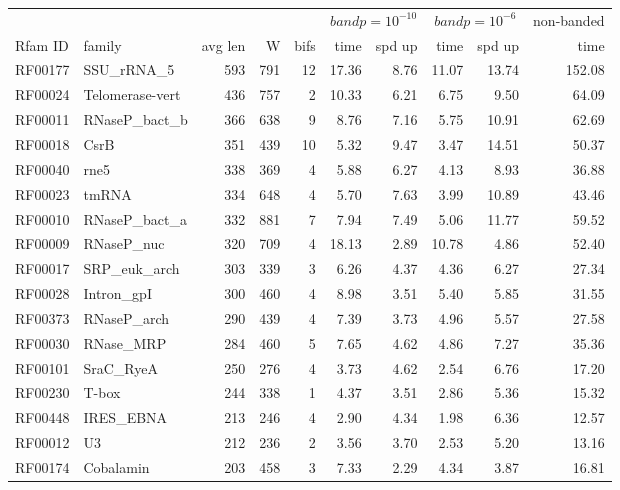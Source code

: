
\begin{table}
\scriptsize
\begin{center}
\begin{tabular}{|ll|rrr|rr|rr|r|} \cline{6-10}
\multicolumn{5}{c}{} & \multicolumn{2}{|c|}{$bandp = 10^{-10}$} &
  \multicolumn{2}{c|}{$bandp = 10^{-6}$} & \multicolumn{1}{c|}{non-banded} \\ \cline{1-5}
Rfam ID & family & avg len & W & bifs & time & spd up & time & spd up & time \\ \hline 
RF00177 & SSU\_rRNA\_5 & 593 & 791 & 12 & 17.36 & 8.76 & 11.07 & 13.74 & 152.08 \\  
RF00024 & Telomerase-vert & 436 & 757 & 2 & 10.33 & 6.21 & 6.75 & 9.50 & 64.09 \\  
RF00011 & RNaseP\_bact\_b & 366 & 638 & 9 & 8.76 & 7.16 & 5.75 & 10.91 & 62.69 \\  
RF00018 & CsrB & 351 & 439 & 10 & 5.32 & 9.47 & 3.47 & 14.51 & 50.37 \\  
RF00040 & rne5 & 338 & 369 & 4 & 5.88 & 6.27 & 4.13 & 8.93 & 36.88 \\  
RF00023 & tmRNA & 334 & 648 & 4 & 5.70 & 7.63 & 3.99 & 10.89 & 43.46 \\  
RF00010 & RNaseP\_bact\_a & 332 & 881 & 7 & 7.94 & 7.49 & 5.06 & 11.77 & 59.52 \\  
RF00009 & RNaseP\_nuc & 320 & 709 & 4 & 18.13 & 2.89 & 10.78 & 4.86 & 52.40 \\  
RF00017 & SRP\_euk\_arch & 303 & 339 & 3 & 6.26 & 4.37 & 4.36 & 6.27 & 27.34 \\  
RF00028 & Intron\_gpI & 300 & 460 & 4 & 8.98 & 3.51 & 5.40 & 5.85 & 31.55 \\  
RF00373 & RNaseP\_arch & 290 & 439 & 4 & 7.39 & 3.73 & 4.96 & 5.57 & 27.58 \\  
RF00030 & RNase\_MRP & 284 & 460 & 5 & 7.65 & 4.62 & 4.86 & 7.27 & 35.36 \\  
RF00101 & SraC\_RyeA & 250 & 276 & 4 & 3.73 & 4.62 & 2.54 & 6.76 & 17.20 \\  
RF00230 & T-box & 244 & 338 & 1 & 4.37 & 3.51 & 2.86 & 5.36 & 15.32 \\  
RF00448 & IRES\_EBNA & 213 & 246 & 4 & 2.90 & 4.34 & 1.98 & 6.36 & 12.57 \\  
RF00012 & U3 & 212 & 236 & 2 & 3.56 & 3.70 & 2.53 & 5.20 & 13.16 \\  
RF00174 & Cobalamin & 203 & 458 & 3 & 7.33 & 2.29 & 4.34 & 3.87 & 16.81 \\  

\end{tabular}
\end{center}
\end{table}
